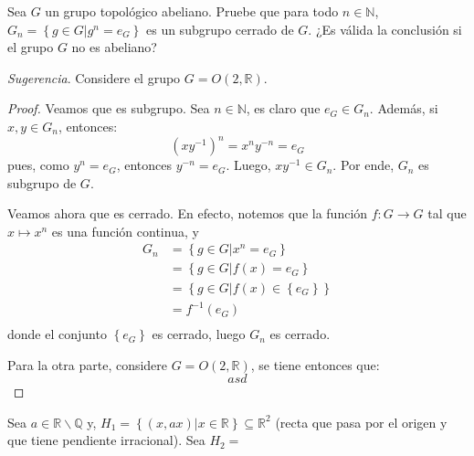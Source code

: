 \documentclass[12pt]{report}
\theoremstyle{largebreak}
\newcommand{\cf}[3]{\ensuremath{#1:#2\rightarrow#3}}
\begin{document}
    \begin{excer}
        Sea $G$ un grupo topológico abeliano. Pruebe que para todo $n\in\mathbb{N}$, $G_n=\left\{g\in G\Big|g^n=e_G \right\}$ es un subgrupo cerrado de $G$. ¿Es válida la conclusión si el grupo $G$ no es abeliano?

        \textit{Sugerencia}. Considere el grupo $G=O(2,\mathbb{R})$.
    \end{excer}

    \begin{proof}
        Veamos que es subgrupo. Sea $n\in\mathbb{N}$, es claro que $e_G\in G_n$. Además, si $x,y\in G_n$, entonces:
        \begin{equation*}
            \left(xy^{-1}\right)^n=x^ny^{-n}=e_G
        \end{equation*}
        pues, como $y^n=e_G$, entonces $y^{-n}=e_G$. Luego, $xy^{-1}\in G_n$. Por ende, $G_n$ es subgrupo de $G$.

        Veamos ahora que es cerrado. En efecto, notemos que la función $\cf{f}{G}{G}$ tal que $x\mapsto x^n$ es una función continua, y
        \begin{equation*}
            \begin{split}
                G_n&=\left\{g\in G\Big| x^n=e_G \right\}\\
                &=\left\{g\in G\Big| f(x)=e_G \right\}\\
                &=\left\{g\in G\Big| f(x)\in\left\{e_G\right\} \right\}\\
                &=f^{-1}(e_G)\\
            \end{split}
        \end{equation*}
        donde el conjunto $\left\{e_G\right\}$ es cerrado, luego $G_n$ es cerrado.

        Para la otra parte, considere $G=O(2,\mathbb{R})$, se tiene entonces que:
        \begin{equation*}
            asd
        \end{equation*} 
    \end{proof}

    \begin{excer}
        Sea $a\in\mathbb{R}\backslash\mathbb{Q}$ y, $H_1=\left\{(x,ax)\Big|x\in\mathbb{R} \right\}\subseteq\mathbb{R}^2$ (recta que pasa por el origen y que tiene pendiente irracional). Sea $H_2=$
    \end{excer}
\end{document}
